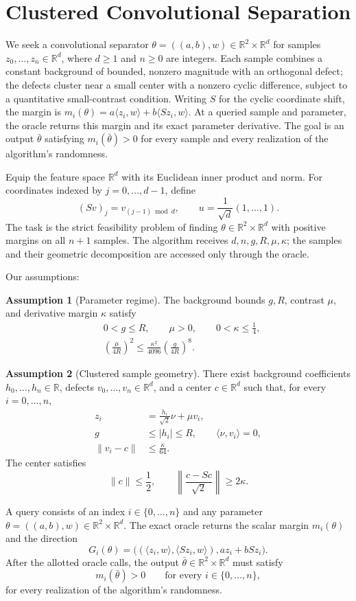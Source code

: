 \documentclass[10pt]{article}
\theoremstyle{definition}
\newtheorem{assumption}{Assumption}
\begin{document}
\section*{Clustered Convolutional Separation}
We seek a convolutional separator $\theta=((a,b),w)\in\mathbb{R}^2\times\mathbb{R}^d$ for samples $z_0,\ldots,z_n\in\mathbb{R}^d$, where $d\geq1$ and $n\geq0$ are integers. Each sample combines a constant background of bounded, nonzero magnitude with an orthogonal defect; the defects cluster near a small center with a nonzero cyclic difference, subject to a quantitative small-contrast condition. Writing $S$ for the cyclic coordinate shift, the margin is $m_i(\theta)=a\langle z_i,w\rangle+b\langle Sz_i,w\rangle$. At a queried sample and parameter, the oracle returns this margin and its exact parameter derivative. The goal is an output $\bar\theta$ satisfying $m_i(\bar\theta)>0$ for every sample and every realization of the algorithm's randomness.

Equip the feature space $\mathbb{R}^d$ with its Euclidean inner product and norm. For coordinates indexed by $j=0,\ldots,d-1$, define
\[
(Sv)_j=v_{(j-1)\bmod d},
\qquad
u=\frac{1}{\sqrt d}(1,\ldots,1).
\]
The task is the strict feasibility problem of finding $\theta\in\mathbb{R}^2\times\mathbb{R}^d$ with positive margins on all $n+1$ samples. The algorithm receives $d,n,g,R,\mu,\kappa$; the samples and their geometric decomposition are accessed only through the oracle.

Our assumptions:
\begin{assumption}[Parameter regime]
The background bounds $g,R$, contrast $\mu$, and derivative margin $\kappa$ satisfy
\[
\begin{aligned}
&0<g\leq R,\qquad \mu>0,\qquad 0<\kappa\leq\frac14,\\
&\left(\frac{\mu}{4R}\right)^2
\leq \frac{\kappa^2}{4096}
\left(\frac{g}{4R}\right)^8.
\end{aligned}
\]
\end{assumption}

\begin{assumption}[Clustered sample geometry]
There exist background coefficients $h_0,\ldots,h_n\in\mathbb{R}$, defects $v_0,\ldots,v_n\in\mathbb{R}^d$, and a center $c\in\mathbb{R}^d$ such that, for every $i=0,\ldots,n$,
\[
\begin{aligned}
z_i&=\frac{h_i}{\sqrt2}\nu+\mu v_i,\\
g&\leq |h_i|\leq R,\qquad \langle\nu,v_i\rangle=0,\\
\|v_i-c\|&\leq\frac{\kappa}{64}.
\end{aligned}
\]
The center satisfies
\[
\|c\|\leq\frac12,
\qquad
\left\|\frac{c-Sc}{\sqrt2}\right\|\geq2\kappa.
\]
\end{assumption}

A query consists of an index $i\in\{0,\ldots,n\}$ and any parameter $\theta=((a,b),w)\in\mathbb{R}^2\times\mathbb{R}^d$. The exact oracle returns the scalar margin $m_i(\theta)$ and the direction
\[
G_i(\theta)=
\bigl((\langle z_i,w\rangle,\langle Sz_i,w\rangle),
      az_i+bSz_i\bigr).
\]
After the allotted oracle calls, the output $\bar\theta\in\mathbb{R}^2\times\mathbb{R}^d$ must satisfy
\[
m_i(\bar\theta)>0
\qquad\text{for every }i\in\{0,\ldots,n\},
\]
for every realization of the algorithm's randomness.
\end{document}
